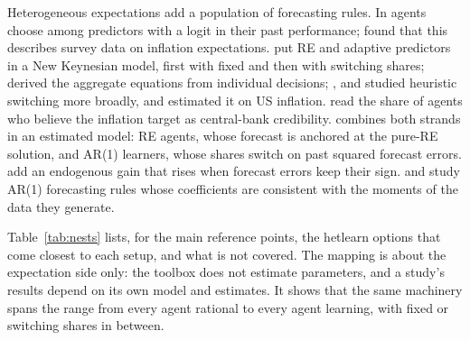 \documentclass[pdflatex,sn-basic]{sn-jnl}
\begin{document}
Heterogeneous expectations add a population of forecasting rules. In \citet{brock1997} agents
choose among predictors with a logit in their past performance; \citet{branch2004} found that
this describes survey data on inflation expectations. \citet{branch2009,branch2010} put RE and
adaptive predictors in a New Keynesian model, first with fixed and then with switching shares;
\citet{massaro2013} derived the aggregate equations from individual decisions;
\citet{degrauwe2011}, \citet{anufriev2012} and \citet{hommes2013,hommes2021} studied heuristic
switching more broadly, and \citet{cornea2019} estimated it on US inflation.
\citet{hommes2019} read the share of agents who believe the inflation target as central-bank
credibility. \citet{ozden2025} combines both strands in an estimated model: RE agents, whose
forecast is anchored at the pure-RE solution, and AR(1) learners, whose shares switch on past
squared forecast errors. \citet{koz2024} add an endogenous gain that rises when forecast errors
keep their sign. \citet{hommeszhu2014} and \citet{hmoz2023} study AR(1) forecasting rules whose
coefficients are consistent with the moments of the data they generate.

Table~\ref{tab:nests} lists, for the main reference points, the hetlearn options that come
closest to each setup, and what is not covered. The mapping is about the expectation side only:
the toolbox does not estimate parameters, and a study's results depend on its own model and
estimates. It shows that the same machinery spans the range from every agent rational to every
agent learning, with fixed or switching shares in between.
\end{document}
